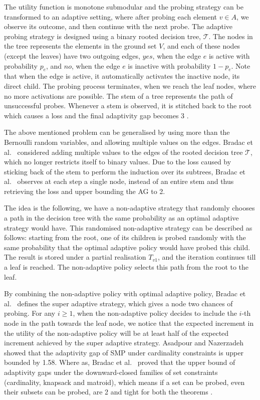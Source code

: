 The utility function is monotone submodular and the probing strategy can be transformed to an adaptive setting, where after probing each element $v \in A$, we observe its outcome, and then continue with the next probe. The adaptive probing strategy is designed using a binary rooted decision tree, $\mathcal{T}$. The nodes in the tree represents the elements in the ground set $V$, and each of these nodes (except  the leaves) have two outgoing edges, $yes$, when the edge $e$ is active with probability $p_e$, and $no$, when the edge $e$ is inactive with probability $1-p_e$. Note that when the edge is active, it automatically activates the inactive node, its direct child. The probing process terminates, when we reach the leaf nodes, where no more activations are possible. The stem of a tree represents the path of unsuccessful probes. Whenever a stem is observed, it is stitched back to the root which causes a loss and the final adaptivity gap becomes 3 \cite{Gupta2017}. 

The above mentioned problem can be generalised by using more than the Bernoulli random variables, and allowing multiple values on the edges. Bradac et al.~\cite{Bradac19} considered adding multiple values to the edges of the rooted decision tree $\mathcal{T}$, which no longer restricts itself to binary values. Due to the loss caused by sticking back of the stem to perform the induction over its subtrees, Bradac et al.~\cite{Bradac19} observes at each step a single node, instead of an entire stem and thus retrieving the loss and upper bounding the AG to 2. 

The idea is the following, we have a non-adaptive strategy that randomly chooses a path in the decision tree with the same probability as an optimal adaptive strategy would have. This randomised non-adaptive strategy can be described as follows:
starting from the root, one of its children is probed randomly with the same probability that the optimal adaptive policy would have probed this child. The result is stored under a partial realisation $T_{v1}$, and the iteration continues till a leaf is reached. The non-adaptive policy selects this path from the root to the leaf.


By combining the non-adaptive policy with optimal adaptive policy, Bradac et al.~\cite{Bradac19} defines the super adaptive strategy, which gives a node two chances of probing. For any $i \geq 1$, when the non-adaptive policy decides to include the $i$-th node in the path towards the leaf node, we notice that the expected increment in the utility of the non-adaptive policy will be at least half of the expected increment achieved by the super adaptive strategy.
Asadpour and Nazerzadeh~\cite{Asadpour16} showed that the adaptivity gap of SMP under cardinality constraints is upper bounded by 1.58.
Where as, Bradac et al.~\cite{Bradac19} proved that the upper bound of adaptivity gaps under the downward-closed families of set constraints (cardinality, knapsack and matroid), which means if a set can be probed, even their subsets can be probed, are 2 and tight for both the theorems \cite{Asadpour16,Bradac19}.


